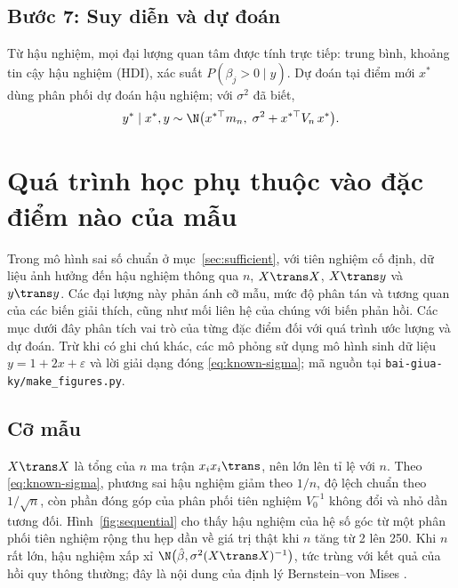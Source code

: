 \documentclass[12pt,a4paper]{report}
\begin{document}
\section{Bước 7: Suy diễn và dự đoán}

Từ hậu nghiệm, mọi đại lượng quan tâm được tính trực tiếp: trung bình, khoảng tin
cậy hậu nghiệm (HDI), xác suất $P(\beta_j > 0 \mid y)$. Dự đoán tại điểm mới
$x^\ast$ dùng phân phối dự đoán hậu nghiệm; với $\sigma^2$ đã biết,
%
\begin{equation}
  \label{eq:predictive}
  y^\ast \mid x^\ast, y \sim
  \N\bigl(x^{\ast\top} m_n,\; \sigma^2 + x^{\ast\top} V_n\, x^\ast\bigr).
\end{equation}

\chapter{Quá trình học phụ thuộc vào đặc điểm nào của mẫu}
\label{sec:dependence}

Trong mô hình sai số chuẩn ở mục~\ref{sec:sufficient}, với tiên nghiệm cố định,
dữ liệu ảnh hưởng đến hậu nghiệm thông qua $n$, $X\trans X$, $X\trans y$ và
$y\trans y$. Các đại lượng này phản ánh cỡ mẫu, mức độ phân tán và tương quan
của các biến giải thích, cũng như mối liên hệ của chúng với biến phản hồi.
Các mục dưới đây phân tích vai trò của từng đặc điểm đối với quá trình ước
lượng và dự đoán. Trừ khi có ghi chú khác, các mô phỏng sử dụng mô hình sinh
dữ liệu $y = 1 + 2x + \varepsilon$ và lời giải dạng đóng
\eqref{eq:known-sigma}; mã nguồn tại \texttt{bai-giua-ky/make\_figures.py}.

\section{Cỡ mẫu}
\label{sec:dep-n}

$X\trans X$ là tổng của $n$ ma trận $x_i x_i\trans$, nên lớn lên tỉ lệ với $n$.
Theo \eqref{eq:known-sigma}, phương sai hậu nghiệm giảm theo $1/n$, độ lệch chuẩn
theo $1/\sqrt{n}$, còn phần đóng góp của phân phối tiên nghiệm $V_0^{-1}$ không đổi và nhỏ dần
tương đối. Hình~\ref{fig:sequential} cho thấy hậu nghiệm của hệ số góc từ một
phân phối tiên nghiệm rộng thu hẹp dần về giá trị thật khi $n$ tăng từ 2 lên 250. Khi $n$ rất
lớn, hậu nghiệm xấp xỉ $\N\bigl(\hat\beta, \sigma^2 (X\trans X)^{-1}\bigr)$, tức
trùng với kết quả của hồi quy thông thường; đây là nội dung của định lý
Bernstein--von Mises \cite{gelman2013bda}.
\end{document}

